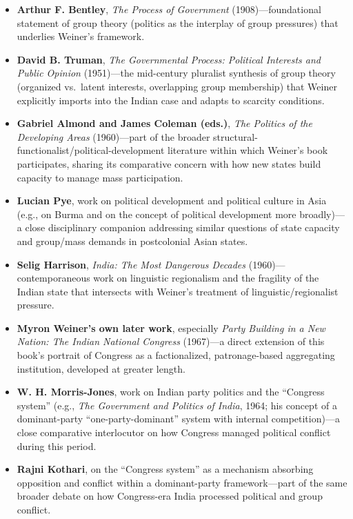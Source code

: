 \documentclass[12pt]{article}
\begin{document}
\begin{itemize}[leftmargin=*, itemsep=4pt]
    \item \textbf{Arthur F. Bentley}, \textit{The Process of Government} (1908)---foundational statement of group theory (politics as the interplay of group pressures) that underlies Weiner's framework.
    \item \textbf{David B. Truman}, \textit{The Governmental Process: Political Interests and Public Opinion} (1951)---the mid-century pluralist synthesis of group theory (organized vs.\ latent interests, overlapping group membership) that Weiner explicitly imports into the Indian case and adapts to scarcity conditions.
    \item \textbf{Gabriel Almond and James Coleman (eds.)}, \textit{The Politics of the Developing Areas} (1960)---part of the broader structural-functionalist/political-development literature within which Weiner's book participates, sharing its comparative concern with how new states build capacity to manage mass participation.
    \item \textbf{Lucian Pye}, work on political development and political culture in Asia (e.g., on Burma and on the concept of political development more broadly)---a close disciplinary companion addressing similar questions of state capacity and group/mass demands in postcolonial Asian states.
    \item \textbf{Selig Harrison}, \textit{India: The Most Dangerous Decades} (1960)---contemporaneous work on linguistic regionalism and the fragility of the Indian state that intersects with Weiner's treatment of linguistic/regionalist pressure.
    \item \textbf{Myron Weiner's own later work}, especially \textit{Party Building in a New Nation: The Indian National Congress} (1967)---a direct extension of this book's portrait of Congress as a factionalized, patronage-based aggregating institution, developed at greater length.
    \item \textbf{W. H. Morris-Jones}, work on Indian party politics and the ``Congress system'' (e.g., \textit{The Government and Politics of India}, 1964; his concept of a dominant-party ``one-party-dominant'' system with internal competition)---a close comparative interlocutor on how Congress managed political conflict during this period.
    \item \textbf{Rajni Kothari}, on the ``Congress system'' as a mechanism absorbing opposition and conflict within a dominant-party framework---part of the same broader debate on how Congress-era India processed political and group conflict.
\end{itemize}
\end{document}
